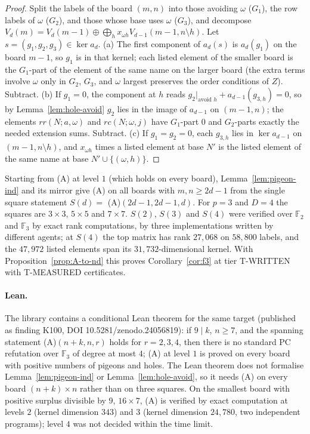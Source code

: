 \begin{proof}
Split the labels of the board $(m,n)$ into those avoiding $\omega$ ($G_1$), the row labels of
$\omega$ ($G_2$), and those whose base uses $\omega$ ($G_3$), and decompose
$V_d(m)=V_d(m-1)\oplus\bigoplus_hx_{\omega h}V_{d-1}(m-1,n\setminus h)$.  Let
$s=(g_1,g_2,g_3)\in\ker a_d$.  (a) The first component of $a_d(s)$ is $a_d(g_1)$ on the board
$m-1$, so $g_1$ is in that kernel; each listed element of the smaller board is the
$G_1$-part of the element of the same name on the larger board (the extra terms involve
$\omega$ only in $G_2$, $G_3$, and $\omega$ largest preserves the order conditions of $Z$).
Subtract.  (b) If $g_1=0$, the component at $h$ reads
$g_2|_{\text{avoid }h}+a_{d-1}(g_{3,h})=0$, so by Lemma~\ref{lem:hole-avoid} $g_2$ lies in
the image of $a_{d-1}$ on $(m-1,n)$; the elements $rr(N;a,\omega)$ and $rc(N;\omega,j)$ have
$G_1$-part $0$ and $G_2$-parts exactly the needed extension sums.  Subtract.  (c) If
$g_1=g_2=0$, each $g_{3,h}$ lies in $\ker a_{d-1}$ on $(m-1,n\setminus h)$, and
$x_{\omega h}$ times a listed element at base $N'$ is the listed element of the same name at
base $N'\cup\{(\omega,h)\}$.
\end{proof}

Starting from (A) at level $1$ (which holds on every board), Lemma~\ref{lem:pigeon-ind} and
its mirror give (A) on all boards with $m,n\ge2d-1$ from the single square statement
$S(d)=$ (A)$(2d-1,2d-1,d)$.  For $p=3$ and $D=4$ the squares are $3\times3$, $5\times5$ and
$7\times7$.  $S(2)$, $S(3)$ and $S(4)$ were verified over $\mathbb F_2$ and $\mathbb F_3$ by
exact rank computations, by three implementations written by different agents; at $S(4)$ the
top matrix has rank $27{,}068$ on $58{,}800$ labels, and the $47{,}972$ listed elements span its
$31{,}732$-dimensional kernel.  With Proposition~\ref{prop:A-to-nd} this proves
Corollary~\ref{cor:f3} at tier T-WRITTEN with T-MEASURED certificates.

\paragraph{Lean.}  The library contains a conditional Lean theorem for the same target
(published as finding K100, DOI 10.5281/zenodo.24056819): if $9\mid k$, $n\ge7$, and the
spanning statement (A)$(n+k,n,r)$ holds for $r=2,3,4$, then there is no standard PC
refutation over $\mathbb F_3$ of degree at most $4$; (A) at level $1$ is proved on every board with positive numbers of pigeons and holes.
The Lean theorem does not formalise Lemma~\ref{lem:pigeon-ind} or
Lemma~\ref{lem:hole-avoid}, so it needs (A) on every board $(n+k)\times n$ rather than on
three squares.  On the smallest board with positive surplus divisible by $9$, $16\times7$, (A) is verified by exact
computation at levels $2$ (kernel dimension $343$) and $3$ (kernel dimension $24{,}780$, two
independent programs); level $4$ was not decided within the time limit.

